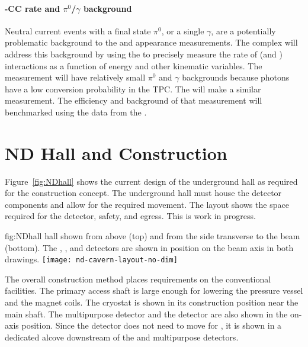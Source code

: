 \subsubsection{\nue-CC rate and $\pi^0$/$\gamma$ background}

Neutral current events with a final state $\pi^0$, or a single $\gamma$, are a potentially problematic background to the \nue and \anue appearance measurements. The   complex will address this background by using the  to precisely measure the rate of \nue (and \anue)  interactions as a function of energy and other kinematic variables. %
The measurement will have relatively small $\pi^0$ and $\gamma$ backgrounds because photons have a low conversion probability in the  TPC. The \larnd will make a similar measurement. The efficiency and background of that measurement will benchmarked using the data from the . 



\chapter{ND Hall and Construction}
\label{sec:appx-nd:exsum-nd-hall}
%

Figure~\ref{fig:NDhall} shows the current design of the underground hall as required for the   construction concept. The underground hall must house the detector components and allow for the required movement. The layout shows the space required for the detector, safety, and egress.  This is work in progress. 

\begin{dunefigure}{fig:NDhall}
{   hall shown from above (top) and from the side transverse to the beam (bottom). The , , and  detectors are shown in position on the beam axis in both drawings. }
\texttt{[image: nd-cavern-layout-no-dim]}
\end{dunefigure}

The overall construction method places requirements on the conventional facilities. 
The primary access shaft is large enough for lowering the pressure vessel and the magnet coils. The  cryostat is shown in its construction position near the main shaft. The multipurpose detector and the  detector are also shown in the on-axis position. Since the  detector does not need to move for , it is shown in a dedicated alcove downstream of the  and multipurpose detectors.



